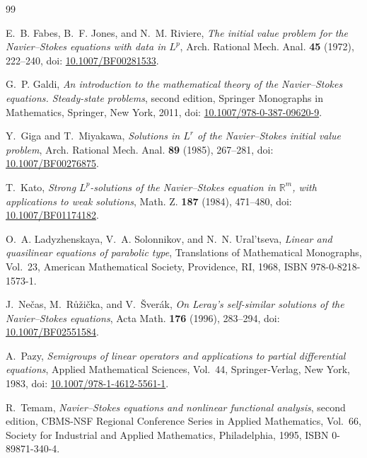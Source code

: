 \documentclass[11pt]{amsart}
\theoremstyle{plain}
\theoremstyle{definition}
\theoremstyle{remark}
\numberwithin{equation}{section}
\begin{document}
\begin{thebibliography}{99}

E.~B. Fabes, B.~F. Jones, and N.~M. Riviere,
\emph{The initial value problem for the Navier--Stokes equations with data in
\(L^p\)},
Arch. Rational Mech. Anal. \textbf{45} (1972), 222--240,
doi: \href{https://doi.org/10.1007/BF00281533}{10.1007/BF00281533}.

G.~P. Galdi,
\emph{An introduction to the mathematical theory of the Navier--Stokes
equations. Steady-state problems},
second edition, Springer Monographs in Mathematics, Springer, New York, 2011,
doi: \href{https://doi.org/10.1007/978-0-387-09620-9}{10.1007/978-0-387-09620-9}.

Y.~Giga and T.~Miyakawa,
\emph{Solutions in \(L^r\) of the Navier--Stokes initial value problem},
Arch. Rational Mech. Anal. \textbf{89} (1985), 267--281,
doi: \href{https://doi.org/10.1007/BF00276875}{10.1007/BF00276875}.

T.~Kato,
\emph{Strong \(L^p\)-solutions of the Navier--Stokes equation in
\(\mathbb R^m\), with applications to weak solutions},
Math. Z. \textbf{187} (1984), 471--480,
doi: \href{https://doi.org/10.1007/BF01174182}{10.1007/BF01174182}.

O.~A. Ladyzhenskaya, V.~A. Solonnikov, and N.~N. Ural'tseva,
\emph{Linear and quasilinear equations of parabolic type},
Translations of Mathematical Monographs, Vol.~23, American Mathematical
Society, Providence, RI, 1968, ISBN 978-0-8218-1573-1.

J.~Ne\v{c}as, M.~R\r{u}\v{z}i\v{c}ka, and V.~\v{S}ver\'ak,
\emph{On Leray's self-similar solutions of the Navier--Stokes equations},
Acta Math. \textbf{176} (1996), 283--294,
doi: \href{https://doi.org/10.1007/BF02551584}{10.1007/BF02551584}.

A.~Pazy,
\emph{Semigroups of linear operators and applications to partial differential
equations},
Applied Mathematical Sciences, Vol.~44, Springer-Verlag, New York, 1983,
doi: \href{https://doi.org/10.1007/978-1-4612-5561-1}{10.1007/978-1-4612-5561-1}.

R.~Temam,
\emph{Navier--Stokes equations and nonlinear functional analysis},
second edition, CBMS-NSF Regional Conference Series in Applied Mathematics,
Vol.~66, Society for Industrial and Applied Mathematics, Philadelphia, 1995,
ISBN 0-89871-340-4.

\end{thebibliography}
\end{document}
